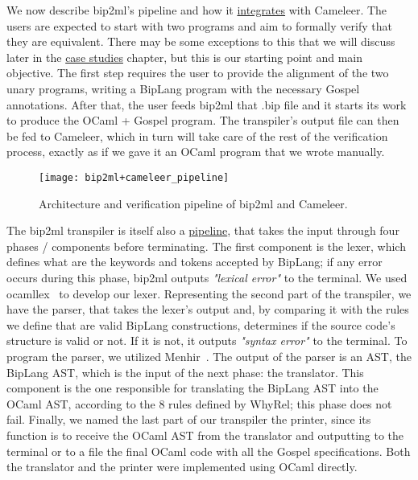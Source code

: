 We now describe bip2ml's pipeline and how it \hyperref[fig:bip2ml_cameleer_pipeline]{integrates} with Cameleer.
The users are expected to start with two programs and aim to formally verify that they are equivalent.
There may be some exceptions to this that we will discuss later in the \hyperref[cha:case_studies]{case studies} chapter, but this is our starting point and main objective.
The first step requires the user to provide the alignment of the two unary programs, writing a BipLang program with the necessary Gospel annotations.
After that, the user feeds bip2ml that .bip file and it starts its work to produce the OCaml + Gospel program.
The transpiler's output file can then be fed to Cameleer, which in turn will take care of the rest of the verification process, exactly as if we gave it an OCaml program that we wrote manually.

\begin{figure}[htbp]
  \centering
  \texttt{[image: bip2ml+cameleer\_pipeline]}
  \caption{Architecture and verification pipeline of bip2ml and Cameleer.}
  \label{fig:bip2ml_cameleer_pipeline}
\end{figure}

The bip2ml transpiler is itself also a \hyperref[fig:bip2ml_cameleer_pipeline]{pipeline}, that takes the input through four phases / components before terminating.
The first component is the lexer, which defines what are the keywords and tokens accepted by BipLang; if any error occurs during this phase, bip2ml outputs \emph{"lexical error"} to the terminal.
We used ocamllex~\cite{ocamllex} to develop our lexer.
Representing the second part of the transpiler, we have the parser, that takes the lexer's output and, by comparing it with the rules we define that are valid BipLang constructions, determines if the source code's structure is valid or not.
If it is not, it outputs \emph{"syntax error"} to the terminal.
To program the parser, we utilized Menhir~\cite{menhir}.
The output of the parser is an AST, the BipLang AST, which is the input of the next phase: the translator.
This component is the one responsible for translating the BipLang AST into the OCaml AST, according to the 8 rules defined by WhyRel; this phase does not fail.
Finally, we named the last part of our transpiler the printer, since its function is to receive the OCaml AST from the translator and outputting to the terminal or to a file the final OCaml code with all the Gospel specifications.
Both the translator and the printer were implemented using OCaml directly.

